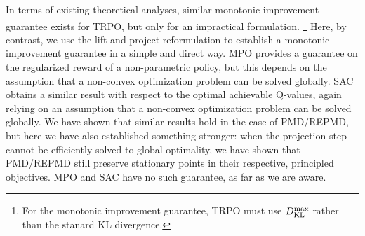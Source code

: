 In terms of existing theoretical analyses, 
similar monotonic improvement guarantee exists for TRPO, but only for an
impractical formulation.%
%
\footnote{
	For the monotonic improvement guarantee,
	TRPO must use $D_{\mathrm{KL}}^{\max} $ rather than the stanard KL divergence.
} 
Here, by contrast,
we use the lift-and-project reformulation to establish a monotonic
improvement guarantee in a simple and direct way.
MPO provides a guarantee on the regularized reward of a non-parametric policy,
but this depends on the assumption that a non-convex optimization problem
can be solved globally.
SAC obtains a similar result with respect to the optimal achievable
Q-values, again relying on an assumption that a non-convex optimization
problem can be solved globally.
We have shown that similar results hold in the case of PMD/REPMD,
but here we have also established something stronger:
when the projection step cannot be efficiently solved to global optimality,
we have shown that PMD/REPMD still preserve stationary points in 
their respective, principled objectives.
MPO and SAC have no such guarantee, as far as we are aware. 

